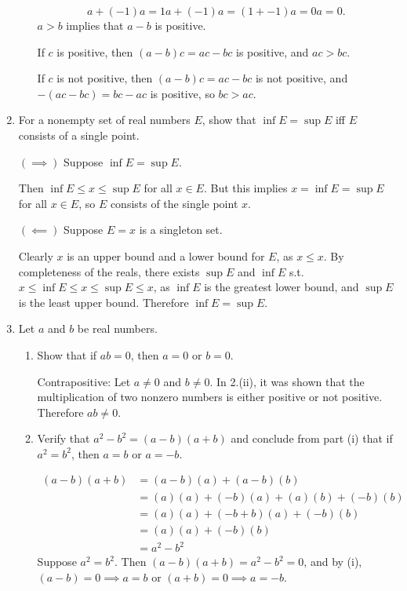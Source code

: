 \begin{enumerate}
\begin{enumerate}[label=(\roman*),align=left]
		\[a+(-1)a = 1a+(-1)a = (1+-1)a = 0a = 0.\]		
		$a>b$ implies that $a-b$ is positive.\par
		If $c$ is positive, then $(a-b)c = ac-bc$ is positive, and $ac>bc$.\par
		If $c$ is not positive, then $(a-b)c = ac-bc$ is not positive, and $-(ac-bc) = bc-ac$ is positive, so $bc>ac$.\par
    \end{enumerate}
	\item For a nonempty set of real numbers $E$, show that $\inf E = \sup E$ iff $E$ consists of a single point.\par
	$(\implies)$ Suppose $\inf E = \sup E$.\par
	Then $\inf E \le x \le \sup E$ for all $x\in E$. But this implies $x = \inf E = \sup E$ for all $x\in E$, so $E$ consists of the single point $x$.\par
	$(\impliedby)$ Suppose $E={x}$ is a singleton set.\par
	Clearly $x$ is an upper bound and a lower bound for $E$, as $x\le x$. 
	By completeness of the reals, there exists $\sup E$ and $\inf E$ s.t. $x \le \inf E \le x \le \sup E \le x$, as $\inf E$ is the greatest lower bound, and $\sup E$ is the least upper bound.
	Therefore $\inf E = \sup E$.
	\item Let $a$ and $b$ be real numbers.
	\begin{enumerate}[label=(\roman*),align=left]
        \item Show that if $ab = 0$, then $a=0$ or $b=0$.\par
        Contrapositive: Let $a\neq0$ and $b\neq0$. In 2.(ii), it was shown that the multiplication of two nonzero numbers is either positive or not positive. Therefore $ab\neq 0$.
        \item Verify that $a^2 -b^2 = (a-b)(a+b)$ and conclude from part (i) that if $a^2 = b^2$, then $a=b$ or $a=-b$.\par
        \begin{align*}
			(a-b)(a+b) & = (a-b)(a) + (a-b)(b) && \tag*{by distributive property}\\
			& = (a)(a)+(-b)(a) + (a)(b)+(-b)(b) && \tag*{by distributive property}\\
			& = (a)(a)+(-b+b)(a) +(-b)(b) && \tag*{by distributive property}\\
			& = (a)(a) +(-b)(b) && \tag*{by additive inverse}\\
			& = a^2 - b^2 
		\end{align*}
		Suppose $a^2=b^2$. Then $(a-b)(a+b)=a^2-b^2=0$, and by (i), $(a-b)=0 \implies a=b$ or $(a+b)=0 \implies a=-b$.

\end{enumerate}
\end{enumerate}
